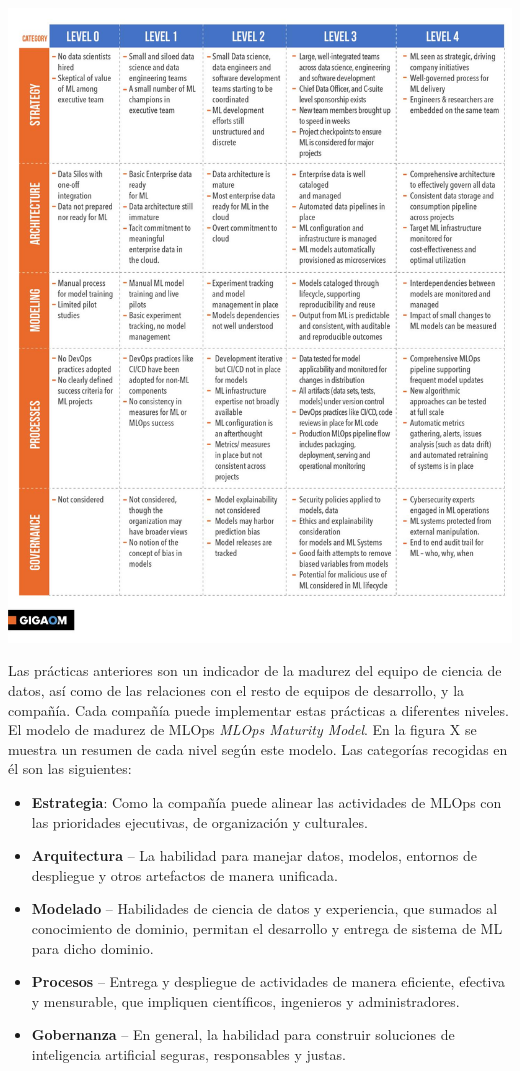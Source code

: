 \documentclass[
  12pt,
  a4paperpaper,
]{report}
\providecommand{\tightlist}{%
  \setlength{\itemsep}{0pt}\setlength{\parskip}{0pt}}
\begin{document}
\includegraphics{source/figures/mlops_levels.jpg}

Las prácticas anteriores son un indicador de la madurez del equipo de
ciencia de datos, así como de las relaciones con el resto de equipos de
desarrollo, y la compañía. Cada compañía puede implementar estas
prácticas a diferentes niveles. El modelo de madurez de MLOps
\emph{MLOps Maturity Model}. En la figura X se muestra un resumen de
cada nivel según este modelo. Las categorías recogidas en él son las
siguientes:

\begin{itemize}
\tightlist
\item
  \textbf{Estrategia}: Como la compañía puede alinear las actividades de
  MLOps con las prioridades ejecutivas, de organización y culturales.
\item
  \textbf{Arquitectura} -- La habilidad para manejar datos, modelos,
  entornos de despliegue y otros artefactos de manera unificada.
\item
  \textbf{Modelado} -- Habilidades de ciencia de datos y experiencia,
  que sumados al conocimiento de dominio, permitan el desarrollo y
  entrega de sistema de ML para dicho dominio.
\item
  \textbf{Procesos} -- Entrega y despliegue de actividades de manera
  eficiente, efectiva y mensurable, que impliquen científicos,
  ingenieros y administradores.
\item
  \textbf{Gobernanza} -- En general, la habilidad para construir
  soluciones de inteligencia artificial seguras, responsables y justas.
\end{itemize}
\end{document}
